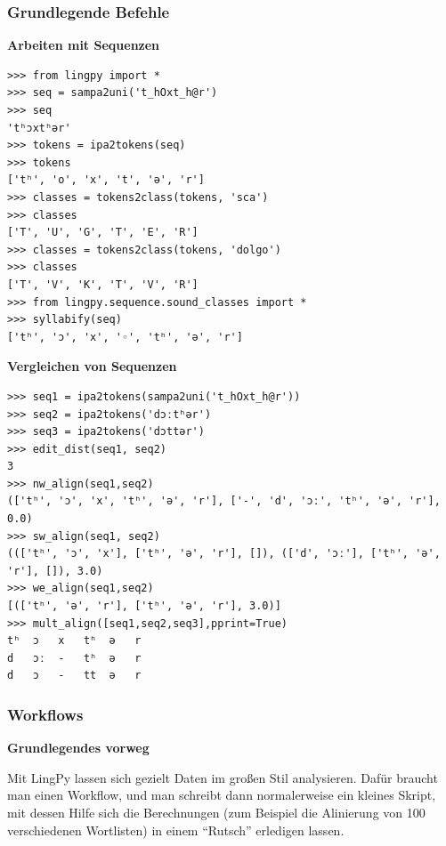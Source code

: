 \subsubsection{\texorpdfstring{{Grundlegende
Befehle}}{Grundlegende Befehle}}

\vspace{0.5cm}\par\noindent\textbf{Arbeiten mit Sequenzen}\vspace{0.5cm}

\begin{verbatim}
>>> from lingpy import *
>>> seq = sampa2uni('t_hOxt_h@r')
>>> seq
'tʰɔxtʰər'
>>> tokens = ipa2tokens(seq)
>>> tokens
['tʰ', 'o', 'x', 't', 'ə', 'r']
>>> classes = tokens2class(tokens, 'sca')
>>> classes
['T', 'U', 'G', 'T', 'E', 'R']
>>> classes = tokens2class(tokens, 'dolgo')
>>> classes
['T', 'V', 'K', 'T', 'V', 'R']
>>> from lingpy.sequence.sound_classes import *
>>> syllabify(seq)
['tʰ', 'ɔ', 'x', '◦', 'tʰ', 'ə', 'r']
\end{verbatim}




\vspace{0.5cm}\par\noindent\textbf{Vergleichen von Sequenzen}\vspace{0.5cm}

\begin{verbatim}
>>> seq1 = ipa2tokens(sampa2uni('t_hOxt_h@r'))
>>> seq2 = ipa2tokens('dɔːtʰər')
>>> seq3 = ipa2tokens('dɔttər')
>>> edit_dist(seq1, seq2)
3
>>> nw_align(seq1,seq2)
(['tʰ', 'ɔ', 'x', 'tʰ', 'ə', 'r'], ['-', 'd', 'ɔː', 'tʰ', 'ə', 'r'], 0.0)
>>> sw_align(seq1, seq2)
((['tʰ', 'ɔ', 'x'], ['tʰ', 'ə', 'r'], []), (['d', 'ɔː'], ['tʰ', 'ə', 'r'], []), 3.0)
>>> we_align(seq1,seq2)
[(['tʰ', 'ə', 'r'], ['tʰ', 'ə', 'r'], 3.0)]
>>> mult_align([seq1,seq2,seq3],pprint=True)
tʰ  ɔ   x   tʰ  ə   r
d   ɔː  -   tʰ  ə   r
d   ɔ   -   tt  ə   r
\end{verbatim}



\subsubsection{\texorpdfstring{{Workflows}}{Workflows}}

\vspace{0.5cm}\par\noindent\textbf{Grundlegendes vorweg}\vspace{0.5cm}

Mit LingPy lassen sich gezielt Daten im großen Stil analysieren. Dafür
braucht man einen Workflow, und man schreibt dann normalerweise ein
kleines Skript, mit dessen Hilfe sich die Berechnungen (zum Beispiel die
Alinierung von 100 verschiedenen Wortlisten) in einem ``Rutsch''
erledigen lassen.

